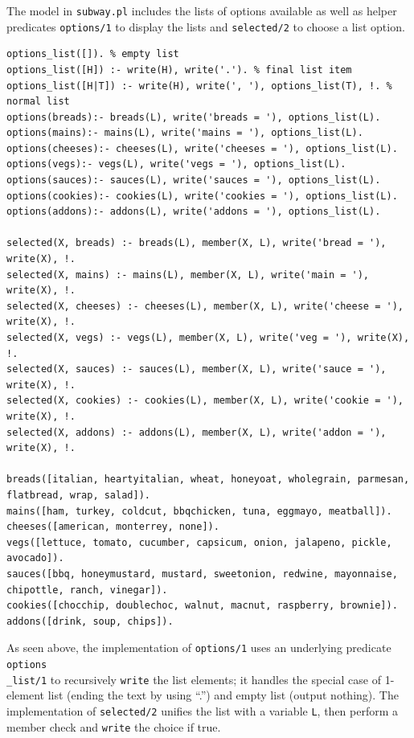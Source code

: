 \documentclass[11pt]{report}
\begin{document}
The model in \texttt{subway.pl} includes the lists of options available as well
as helper predicates \texttt{options/1} to display the lists and
\texttt{selected/2} to choose a list option.

\begin{lstlisting}
options_list([]). % empty list
options_list([H]) :- write(H), write('.'). % final list item
options_list([H|T]) :- write(H), write(', '), options_list(T), !. % normal list
options(breads):- breads(L), write('breads = '), options_list(L).
options(mains):- mains(L), write('mains = '), options_list(L).
options(cheeses):- cheeses(L), write('cheeses = '), options_list(L).
options(vegs):- vegs(L), write('vegs = '), options_list(L).
options(sauces):- sauces(L), write('sauces = '), options_list(L).
options(cookies):- cookies(L), write('cookies = '), options_list(L).
options(addons):- addons(L), write('addons = '), options_list(L).

selected(X, breads) :- breads(L), member(X, L), write('bread = '), write(X), !.
selected(X, mains) :- mains(L), member(X, L), write('main = '), write(X), !.
selected(X, cheeses) :- cheeses(L), member(X, L), write('cheese = '), write(X), !.
selected(X, vegs) :- vegs(L), member(X, L), write('veg = '), write(X), !.
selected(X, sauces) :- sauces(L), member(X, L), write('sauce = '), write(X), !.
selected(X, cookies) :- cookies(L), member(X, L), write('cookie = '), write(X), !.
selected(X, addons) :- addons(L), member(X, L), write('addon = '), write(X), !.

breads([italian, heartyitalian, wheat, honeyoat, wholegrain, parmesan, flatbread, wrap, salad]).
mains([ham, turkey, coldcut, bbqchicken, tuna, eggmayo, meatball]).
cheeses([american, monterrey, none]).
vegs([lettuce, tomato, cucumber, capsicum, onion, jalapeno, pickle, avocado]).
sauces([bbq, honeymustard, mustard, sweetonion, redwine, mayonnaise, chipottle, ranch, vinegar]).
cookies([chocchip, doublechoc, walnut, macnut, raspberry, brownie]).
addons([drink, soup, chips]).
\end{lstlisting}

As seen above, the implementation of \texttt{options/1} uses an underlying 
predicate \texttt{options\\\_list/1} to recursively \texttt{write} the list
elements; it handles the special case of 1-element list (ending the text by
using ``.'') and empty list (output nothing). The implementation of
\texttt{selected/2} unifies the list with a variable \texttt{L}, then perform
a member check and \texttt{write} the choice if true.
\end{document}
